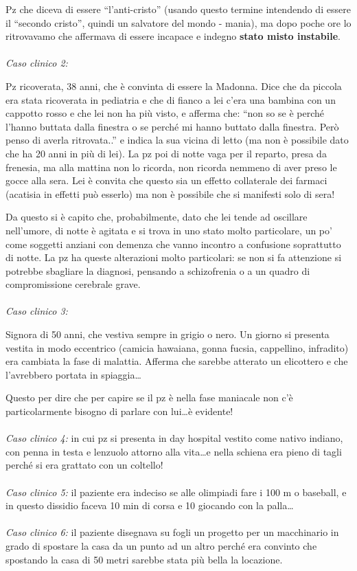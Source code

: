 Pz che diceva di essere ``l'anti-cristo'' (usando questo termine
intendendo di essere il ``secondo cristo'', quindi un salvatore del
mondo - mania), ma dopo poche ore lo ritrovavamo che affermava di essere
incapace e indegno \textbf{stato misto instabile}.
\\\\
\emph{Caso clinico 2:}

Pz ricoverata, 38 anni, che è convinta di essere la Madonna. Dice che da
piccola era stata ricoverata in pediatria e che di fianco a lei c'era
una bambina con un cappotto rosso e che lei non ha più visto, e afferma
che: ``non so se è perché l'hanno buttata dalla finestra o se perché mi
hanno buttato dalla finestra. Però penso di averla ritrovata..'' e
indica la sua vicina di letto (ma non è possibile dato che ha 20 anni in
più di lei). La pz poi di notte vaga per il reparto, presa da frenesia,
ma alla mattina non lo ricorda, non ricorda nemmeno di aver preso le
gocce alla sera. Lei è convita che questo sia un effetto collaterale dei
farmaci (acatisia in effetti può esserlo) ma non è possibile che si
manifesti solo di sera!

Da questo si è capito che, probabilmente, dato che lei tende ad
oscillare nell'umore, di notte è agitata e si trova in uno stato molto
particolare, un po' come soggetti anziani con demenza che vanno incontro
a confusione soprattutto di notte. La pz ha queste alterazioni molto
particolari: se non si fa attenzione si potrebbe sbagliare la diagnosi,
pensando a schizofrenia o a un quadro di compromissione cerebrale grave.
\\\\
\emph{Caso clinico 3:}

Signora di 50 anni, che vestiva sempre in grigio o nero. Un giorno si
presenta vestita in modo eccentrico (camicia hawaiana, gonna fucsia,
cappellino, infradito) era cambiata la fase di malattia. Afferma che
sarebbe atterato un elicottero e che l'avrebbero portata in
spiaggia\ldots{}

Questo per dire che per capire se il pz è nella fase maniacale non c'è
particolarmente bisogno di parlare con lui\ldots{}è evidente!
\\\\
\emph{Caso clinico 4:} in cui pz si presenta in day hospital vestito
come nativo indiano, con penna in testa e lenzuolo attorno alla
vita\ldots{}e nella schiena era pieno di tagli perché si era grattato
con un coltello!
\\\\
\emph{Caso clinico 5:} il paziente era indeciso se alle olimpiadi fare i
100 m o baseball, e in questo dissidio faceva 10 min di corsa e 10
giocando con la palla\ldots{}
\\\\
\emph{Caso clinico 6:} il paziente disegnava su fogli un progetto per un
macchinario in grado di spostare la casa da un punto ad un altro perché
era convinto che spostando la casa di 50 metri sarebbe stata più bella
la locazione.

